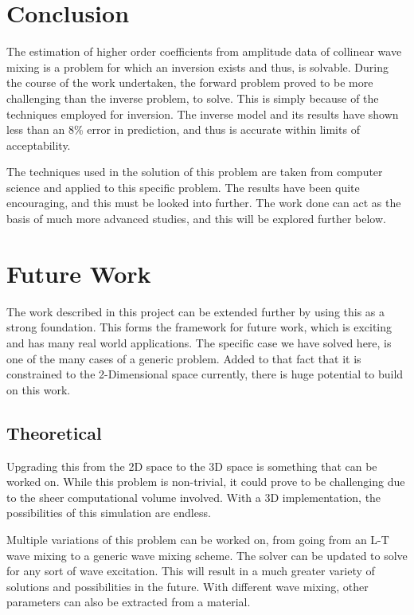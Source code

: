\section{Conclusion}
The estimation of higher order coefficients from amplitude data of collinear wave mixing is  a problem for which an inversion exists and thus, is solvable. During the course of the work undertaken, the forward problem proved to be more challenging than the inverse problem, to solve. This is simply because of the techniques employed for inversion. The inverse model and its results have shown less than an 8\% error in prediction, and thus is accurate within limits of acceptability.

The techniques used in the solution of this problem are taken from computer science and applied to this specific problem. The results have been quite encouraging, and this must be looked into further. The work done can act as the basis of much more advanced studies, and this will be explored further below. 

\section{Future Work}
The work described in this project can be extended further by using this as a strong foundation. This forms the framework for future work, which is exciting and has many real world applications. The specific case we have solved here, is one of the many cases of a generic problem. Added to that fact that it is constrained to the 2-Dimensional space currently, there is huge potential to build on this work.

\subsection{Theoretical}
Upgrading this from the 2D space to the 3D space is something that can be worked on. While this problem is non-trivial, it could prove to be challenging due to the sheer computational volume involved. With a 3D implementation, the possibilities of this simulation are endless.\cite{noncollinear} \cite{phd_thesis}

Multiple variations of this problem can be worked on, from going from an L-T wave mixing to a generic wave mixing scheme. The solver can be updated to solve for any sort of wave excitation. This will result in a much greater variety of solutions and possibilities in the future. With different wave mixing, other parameters can also be extracted from a material.

